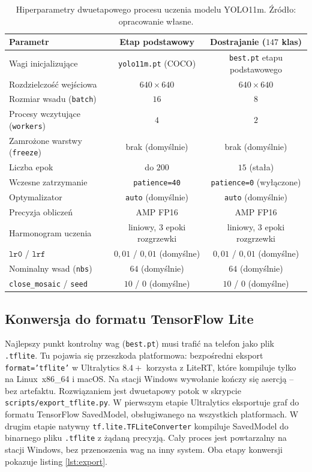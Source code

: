 \begin{table}[htbp]
 \centering
 \caption{Hiperparametry dwuetapowego procesu uczenia modelu YOLO11m. Źródło: opracowanie własne.}
 \label{tab:parametry_treningu}
 \begin{tabular}{|p{4.5cm}|c|c|}
 \hline
 \textbf{Parametr} & \textbf{Etap podstawowy} & \textbf{Dostrajanie ($147$ klas)} \\
 \hline \hline
 Wagi inicjalizujące & \texttt{yolo11m.pt} (COCO) & \texttt{best.pt} etapu podstawowego \\
 \hline
 Rozdzielczość wejściowa & $640\times640$ & $640\times640$ \\
 \hline
 Rozmiar wsadu (\texttt{batch}) & $16$ & $8$ \\
 \hline
 Procesy wczytujące (\texttt{workers}) & $4$ & $2$ \\
 \hline
 Zamrożone warstwy (\texttt{freeze}) & brak (domyślnie) & brak (domyślnie) \\
 \hline
 Liczba epok & do $200$ & $15$ (stała) \\
 \hline
 Wczesne zatrzymanie & \texttt{patience=40} & \texttt{patience=0} (wyłączone) \\
 \hline
 Optymalizator & \texttt{auto} (domyślnie) & \texttt{auto} (domyślnie) \\
 \hline
 Precyzja obliczeń & AMP FP16 & AMP FP16 \\
 \hline
 Harmonogram uczenia & liniowy, $3$ epoki rozgrzewki & liniowy, $3$ epoki rozgrzewki \\
 \hline
 $\texttt{lr0}$ / $\texttt{lrf}$ & $0{,}01$ / $0{,}01$ (domyślne) & $0{,}01$ / $0{,}01$ (domyślne) \\
 \hline
 Nominalny wsad (\texttt{nbs}) & $64$ (domyślnie) & $64$ (domyślnie) \\
 \hline
 \texttt{close\_mosaic} / \texttt{seed} & $10$ / $0$ (domyślne) & $10$ / $0$ (domyślne) \\
 \hline
 \end{tabular}
\end{table}

\subsection{Konwersja do formatu TensorFlow Lite}
Najlepszy punkt kontrolny wag (\texttt{best.pt}) musi trafić na telefon jako plik \texttt{.tflite}. Tu pojawia się przeszkoda platformowa: bezpośredni eksport \texttt{format='tflite'} w Ultralytics $8.4+$ korzysta z LiteRT, które kompiluje tylko na Linux~x86\_64 i macOS. Na stacji Windows wywołanie kończy się asercją – bez artefaktu. Rozwiązaniem jest dwuetapowy potok w skrypcie \texttt{scripts/export\_tflite.py}. W pierwszym etapie Ultralytics eksportuje graf do formatu TensorFlow SavedModel, obsługiwanego na wszystkich platformach. W drugim etapie natywny \texttt{tf.lite.TFLiteConverter} kompiluje SavedModel do binarnego pliku \texttt{.tflite} z żądaną precyzją. Cały proces jest powtarzalny na stacji Windows, bez przenoszenia wag na inny system. Oba etapy konwersji pokazuje listing \ref{lst:export}.

